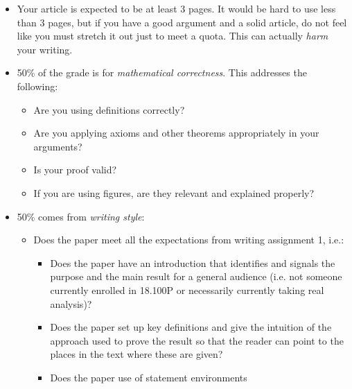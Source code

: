 \documentclass{article}
\begin{document}
    \begin{itemize}
        \item
            Your article is expected to be at least 3 pages.
            It would be hard to use less than 3 pages, but if you have
            a good argument and a solid article, do not feel like you
            must stretch it out just to meet a quota. This can actually
            \textit{harm} your writing.
        \item
            50\% of the grade is for \textit{mathematical correctness}.
            This addresses the following:
            \begin{itemize}
                \item
                    Are you using definitions correctly?
                \item
                    Are you applying axioms and other theorems
                    appropriately in your arguments?
                \item
                    Is your proof valid?
                \item
                    If you are using figures, are they relevant and explained
                    properly?
            \end{itemize}
        \item
            50\% comes from \textit{writing style}:
            \begin{itemize}
                \item
                    Does the paper meet all the expectations
                    from writing assignment 1, i.e.:
                    \begin{itemize}
                        \item
                            Does the paper have an introduction that identifies
                            and signals the purpose and the main result for a
                            general audience (i.e. not someone currently
                            enrolled in 18.100P or necessarily currently
                            taking real analysis)?
                        \item
                            Does the paper set up key definitions and give the
                            intuition of the approach used to prove the result
                            so that the reader can point to the places in the
                            text where these are given?
                        \item
                            Does the paper use of statement environments

\end{itemize}
\end{itemize}
\end{itemize}
\end{document}
